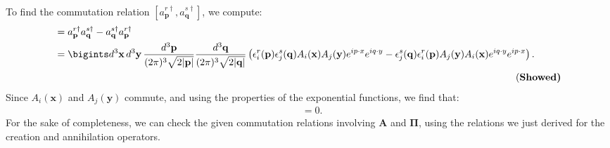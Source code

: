 \begin{enumerate}
\begin{align}
\end{align}
To find the commutation relation $[a^{r\dagger}_{\mathbf{p}}, a^{s\dagger}_{\mathbf{q}}]$, we compute:
\begin{align}
    [a^{r\dagger}_{\mathbf{p}}, a^{s\dagger}_{\mathbf{q}}] &= a^{r\dagger}_{\mathbf{p}} a^{s\dagger}_{\mathbf{q}} - a^{s\dagger}_{\mathbf{q}} a^{r\dagger}_{\mathbf{p}}\notag\\
    &= \bigints d^3 \mathbf{x} \, d^3 \mathbf{y} \, \frac{d^3 \mathbf{p}}{(2\pi)^3 \sqrt{2|\mathbf{p}|}} \frac{d^3 \mathbf{q}}{(2\pi)^3 \sqrt{2|\mathbf{q}|}} \left( \epsilon_i^r(\mathbf{p}) \epsilon_j^s(\mathbf{q}) A_i(\mathbf{x}) A_j(\mathbf{y}) e^{i p \cdot x} e^{i q \cdot y} - \epsilon_j^s(\mathbf{q}) \epsilon_i^r(\mathbf{p}) A_j(\mathbf{y}) A_i(\mathbf{x}) e^{i q \cdot y} e^{i p \cdot x} \right).\\
    &\hspace{6.5in}\text{(\bf Showed)}\notag
\end{align}
Since $A_i(\mathbf{x})$ and $A_j(\mathbf{y})$ commute, and using the properties of the exponential functions, we find that:
\begin{align}
    [a^{r\dagger}_{\mathbf{p}}, a^{s\dagger}_{\mathbf{q}}] &= 0.
\end{align}
For the sake of completeness, we can check the given commutation relations involving $\mathbf{A}$ and $\boldsymbol{\Pi}$, using the relations we just derived for the creation and annihilation operators.


\end{enumerate}
